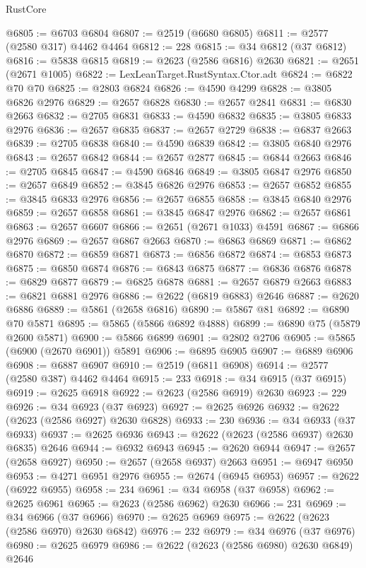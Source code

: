 \begin{lexlean}{RustCore}
\begin{coremodule}
@6805 := @6703 @6804
@6807 := @2519 (@6680 @6805)
@6811 := @2577 (@2580 @317) @4462 @4464
@6812 := 228
@6815 := @34 @6812 (@37 @6812)
@6816 := @5838 @6815
@6819 := @2623 (@2586 @6816) @2630
@6821 := @2651 (@2671 @1005)
@6822 := LexLeanTarget.RustSyntax.Ctor.adt
@6824 := @6822 @70 @70
@6825 := @2803 @6824
@6826 := @4590 @4299
@6828 := @3805 @6826 @2976
@6829 := @2657 @6828
@6830 := @2657 @2841
@6831 := @6830 @2663
@6832 := @2705 @6831
@6833 := @4590 @6832
@6835 := @3805 @6833 @2976
@6836 := @2657 @6835
@6837 := @2657 @2729
@6838 := @6837 @2663
@6839 := @2705 @6838
@6840 := @4590 @6839
@6842 := @3805 @6840 @2976
@6843 := @2657 @6842
@6844 := @2657 @2877
@6845 := @6844 @2663
@6846 := @2705 @6845
@6847 := @4590 @6846
@6849 := @3805 @6847 @2976
@6850 := @2657 @6849
@6852 := @3845 @6826 @2976
@6853 := @2657 @6852
@6855 := @3845 @6833 @2976
@6856 := @2657 @6855
@6858 := @3845 @6840 @2976
@6859 := @2657 @6858
@6861 := @3845 @6847 @2976
@6862 := @2657 @6861
@6863 := @2657 @6607
@6866 := @2651 (@2671 @1033) @4591
@6867 := @6866 @2976
@6869 := @2657 @6867 @2663
@6870 := @6863 @6869
@6871 := @6862 @6870
@6872 := @6859 @6871
@6873 := @6856 @6872
@6874 := @6853 @6873
@6875 := @6850 @6874
@6876 := @6843 @6875
@6877 := @6836 @6876
@6878 := @6829 @6877
@6879 := @6825 @6878
@6881 := @2657 @6879 @2663
@6883 := @6821 @6881 @2976
@6886 := @2622 (@6819 @6883) @2646
@6887 := @2620 @6886
@6889 := @5861 (@2658 @6816)
@6890 := @5867 @81
@6892 := @6890 @70 @5871
@6895 := @5865 (@5866 @6892 @4888)
@6899 := @6890 @75 (@5879 @2600 @5871)
@6900 := @5866 @6899
@6901 := @2802 @2706
@6905 := @5865 (@6900 (@2670 @6901)) @5891
@6906 := @6895 @6905
@6907 := @6889 @6906
@6908 := @6887 @6907
@6910 := @2519 (@6811 @6908)
@6914 := @2577 (@2580 @387) @4462 @4464
@6915 := 233
@6918 := @34 @6915 (@37 @6915)
@6919 := @2625 @6918
@6922 := @2623 (@2586 @6919) @2630
@6923 := 229
@6926 := @34 @6923 (@37 @6923)
@6927 := @2625 @6926
@6932 := @2622 (@2623 (@2586 @6927) @2630 @6828)
@6933 := 230
@6936 := @34 @6933 (@37 @6933)
@6937 := @2625 @6936
@6943 := @2622 (@2623 (@2586 @6937) @2630 @6835) @2646
@6944 := @6932 @6943
@6945 := @2620 @6944
@6947 := @2657 (@2658 @6927)
@6950 := @2657 (@2658 @6937) @2663
@6951 := @6947 @6950
@6953 := @4271 @6951 @2976
@6955 := @2674 (@6945 @6953)
@6957 := @2622 (@6922 @6955)
@6958 := 234
@6961 := @34 @6958 (@37 @6958)
@6962 := @2625 @6961
@6965 := @2623 (@2586 @6962) @2630
@6966 := 231
@6969 := @34 @6966 (@37 @6966)
@6970 := @2625 @6969
@6975 := @2622 (@2623 (@2586 @6970) @2630 @6842)
@6976 := 232
@6979 := @34 @6976 (@37 @6976)
@6980 := @2625 @6979
@6986 := @2622 (@2623 (@2586 @6980) @2630 @6849) @2646

\end{coremodule}
\end{lexlean}
